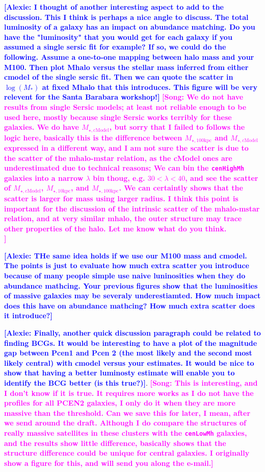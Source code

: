 \documentclass{emulateapj}
\def\rbcg{\texttt{cenHighMh}}
\def\nbcg{\texttt{cenLowMh}}
\def\minn{{$M_{\star,10\mathrm{kpc}}$}}
\def\mtot{{$M_{\star,100\mathrm{kpc}}$}}
\def\mcmodel{{$M_{\star,\mathrm{cModel}}$}}
\newcommand{\song}[1]{\textcolor{magenta}{\textbf{[Song: #1]}}}
\newcommand{\alexie}[1]{\textcolor{blue}{\textbf{[Alexie: #1]}}}
\begin{document}
\begin{CJK*}{UTF8}{gbsn}
    
    \alexie{I thought of another interesting aspect to add to the discussion. This I think is perhaps a nice angle to discuss. The total luminosity of a galaxy has an impact on abundance matching. Do you have the "luminosity" that you would get for each galaxy if you assumed a single sersic fit for example? If so, we could do the following. Assume a one-to-one mapping between halo mass and your M100. Then plot Mhalo versus the stellar mass inferred from either cmodel of the single sersic fit. Then we can quote the scatter in $\log(M_*)$ at fixed Mhalo that this introduces. This figure will be very relevent for the Santa Barabara workshop!}
    \song{We do not have results from single Sersic models; at least not reliable enough 
    to be used here, mostly because single Sersic works terribly for these galaxies.
    We do have \mcmodel{}, but sorry that I failed to follows the logic here, basically this is 
    the difference between \mtot{} and \mcmodel{} expressed in a different way, and I am not 
    sure the scatter is due to the scatter of the mhalo-mstar relation, as the cModel 
    ones are underestimated due to technical reasons; We can bin the \rbcg{} galaxies 
    into a narrow $\lambda$ bin thoug, e.g. $30< \lambda < 40$, and see the scatter of 
    \mcmodel{}, \minn{}, and \mtot{}. We can certaintly shows that the scatter is larger 
    for mass using larger radius.  I think this point is important for the discussion
    of the intrinsic scatter of the mhalo-mstar relation, and at very similar mhalo,
    the outer structure may trace other properties of the halo. Let me know what do 
    you think.\\}
    
    \alexie{THe same idea holds if we use our M100 mass and cmodel. The points is just to evaluate how much extra scatter you introduce because of many people simple use naive luninosities when they do abundance mathcing. Your previous figures show that the luminosities of massive galaxies may be severaly underestiamted. How much impact does this have on abundance mathcing? How much extra scatter does it introduce?}
    
    \alexie{Finally, another quick discussion paragraph could be related to finding BCGs. It would be interesting to have a plot of the magnitude gap between Pcen1 and Pcen 2 (the most likely and the second most likely central) with cmodel versus your estimates. It would be nice to show that having a better luminosty estimate will enable you to identify the BCG better (is this true?)}.
    \song{This is interesting, and I don't know if it is true. It requires more works as 
    I do not have the profiles for all PCEN2 galaxies, I only do it when they are more 
    massive than the threshold.  Can we save this for later, I mean, after we send around 
    the draft.  Although I do compare the structures of really massive satellites in 
    these clusters with the \nbcg{} galaxies, and the results show little difference,    basically shows that the structure difference could be unique for central galaxies. 
    I originally show a figure for this, and will send you along the e-mail.}
    

\end{CJK*}
\end{document}
